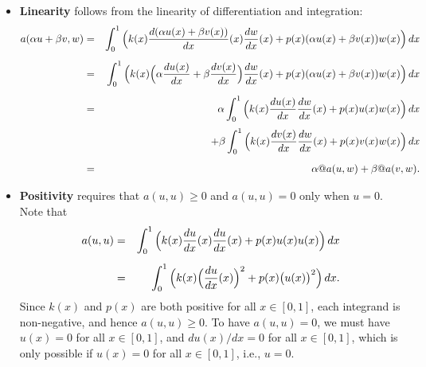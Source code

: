 {\begin{solution}
\begin{enumerate}
\begin{itemize}
      \item \textbf{Linearity} follows from the
            linearity of differentiation and integration:
            \begin{eqnarray*}
              a(\alpha u + \beta v, w)
               &=& \int_0^1 \Big( k(x) {d(\alpha u(x) + \beta v(x))\over dx}(x) {dw\over dx}(x)
                              + p(x) (\alpha u(x) + \beta v(x)) w(x)\Big)\,dx \\[0.5em]
               &=& \int_0^1 \Big( k(x) \Big(\alpha {du(x)\over dx} + \beta{dv(x)\over dx}\Big) {dw\over dx}(x)
                              + p(x) (\alpha u(x) + \beta v(x)) w(x)\Big)\,dx \\[0.5em]
               &=& \alpha \int_0^1 \Big( k(x) {du(x)\over dx} {dw\over dx}(x) + 
                                            p(x) u(x) w(x)\Big)\,dx \\[0.25em]
               && \ \ \ 
                   +\beta \int_0^1 \Big( k(x) {dv(x)\over dx} {dw\over dx}(x) + 
                                            p(x) v(x) w(x)\Big)\,dx  \\[0.5em]
               &=& \alpha @ a(u,w) + \beta @ a(v,w).
               \end{eqnarray*}
      \item \textbf{Positivity} requires that $a(u,u) \ge 0$ and $a(u,u) = 0$ only when $u=0$.
            Note that
               \begin{eqnarray*}
               a(u,u) &=& \int_0^1 \Big( k(x) {du \over dx}(x) {du\over dx}(x)
                              + p(x) u(x) u(x)\Big)\,dx \\[0.5em]
                      &=& \int_0^1 \Big( k(x) \Big({du \over dx}(x)\Big)^2 
                              + p(x) \big(u(x)\big)^2 \Big)\,dx.
               \end{eqnarray*}
            Since $k(x)$ and $p(x)$ are both positive for all $x\in[0,1]$, 
            each integrand is non-negative, and hence $a(u,u)\ge 0$.
            To have $a(u,u)=0$, we must have $u(x) = 0$ for all $x\in[0,1]$,
            and $du(x)/dx = 0$ for all $x\in[0,1]$, which is only possible
            if $u(x)=0$ for all $x\in[0,1]$, i.e., $u=0$.
      \end{itemize}
\end{enumerate}
\end{solution}}{}

